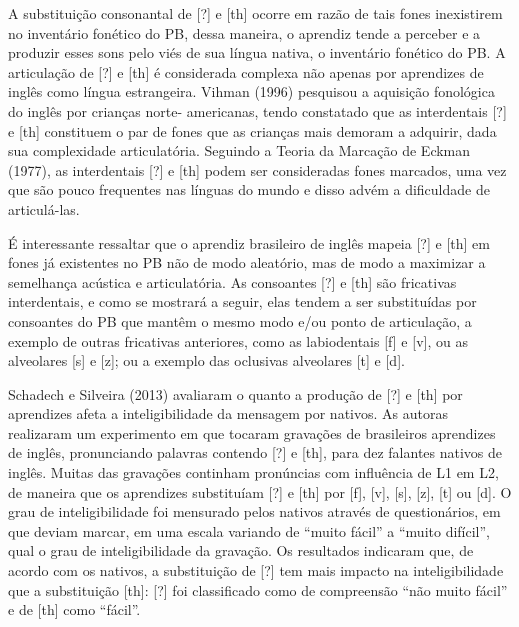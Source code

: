 A substitui\c{c}\~ao consonantal de {[}?{]} e {[}th{]} ocorre em raz\~ao de tais
fones inexistirem no invent\'ario fon\'etico do PB, dessa maneira, o
aprendiz tende a perceber e a produzir esses sons pelo vi\'es de sua
l\'ingua nativa, o invent\'ario fon\'etico do PB. A articula\c{c}\~ao de {[}?{]} e
{[}th{]} \'e considerada complexa n\~ao apenas por aprendizes de ingl\^es como
l\'ingua estrangeira. Vihman (1996) pesquisou a aquisi\c{c}\~ao fonol\'ogica do
ingl\^es por crian\c{c}as norte- americanas, tendo constatado que as
interdentais {[}?{]} e {[}th{]} constituem o par de fones que as crian\c{c}as
mais demoram a adquirir, dada sua complexidade articulat\'oria. Seguindo a
Teoria da Marca\c{c}\~ao de Eckman (1977), as interdentais {[}?{]} e {[}th{]}
podem ser consideradas fones marcados, uma vez que s\~ao pouco frequentes
nas l\'inguas do mundo e disso adv\'em a dificuldade de articul\'a-las.

\'E interessante ressaltar que o aprendiz brasileiro de ingl\^es mapeia
{[}?{]} e {[}th{]} em fones j\'a existentes no PB n\~ao de modo aleat\'orio,
mas de modo a maximizar a semelhan\c{c}a ac\'ustica e articulat\'oria. As
consoantes {[}?{]} e {[}th{]} s\~ao fricativas interdentais, e como se
mostrar\'a a seguir, elas tendem a ser substitu\'idas por consoantes do PB
que mant\^em o mesmo modo e/ou ponto de articula\c{c}\~ao, a exemplo de outras
fricativas anteriores, como as labiodentais {[}f{]} e {[}v{]}, ou as
alveolares {[}s{]} e {[}z{]}; ou a exemplo das oclusivas alveolares
{[}t{]} e {[}d{]}.

Schadech e Silveira (2013) avaliaram o quanto a produ\c{c}\~ao de {[}?{]} e
{[}th{]} por aprendizes afeta a inteligibilidade da mensagem por nativos.
As autoras realizaram um experimento em que tocaram grava\c{c}\~oes de
brasileiros aprendizes de ingl\^es, pronunciando palavras contendo {[}?{]}
e {[}th{]}, para dez falantes nativos de ingl\^es. Muitas das grava\c{c}\~oes
continham pron\'uncias com influ\^encia de L1 em L2, de maneira que os
aprendizes substitu\'iam {[}?{]} e {[}th{]} por {[}f{]}, {[}v{]}, {[}s{]},
{[}z{]}, {[}t{]} ou {[}d{]}. O grau de inteligibilidade foi mensurado
pelos nativos atrav\'es de question\'arios, em que deviam marcar, em uma
escala variando de ``muito f\'acil'' a ``muito dif\'icil'', qual o grau de
inteligibilidade da grava\c{c}\~ao. Os resultados indicaram que, de acordo com
os nativos, a substitui\c{c}\~ao de {[}?{]} tem mais impacto na
inteligibilidade que a substitui\c{c}\~ao {[}th{]}: {[}?{]} foi classificado
como de compreens\~ao ``n\~ao muito f\'acil'' e de {[}th{]} como ``f\'acil''.

